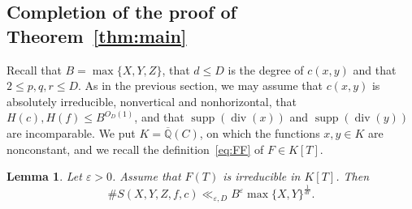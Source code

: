 \documentclass[a4paper,11pt,twoside,reqno]{amsart}
\newtheorem{lemma}[theorem]{Lemma}
\theoremstyle{definition}
\theoremstyle{remark}
\numberwithin{equation}{section}
\newcommand\eps{\varepsilon}
\newcommand\ve{\varepsilon}
\newcommand\supp{\operatorname{supp}}
\newcommand\Q{\mathbb{Q}}
\newcommand\1{\mathbf{1}}
\renewcommand{\leq}{\leqslant}
\begin{document}
\subsection{Completion of the proof of Theorem~\ref{thm:main}}

Recall that $B=\max\{X,Y,Z\}$, that $d\leq D$ is the degree of $c(x,y)$ and that 
 $2\leq p,q,r\leq D$.
As in the previous section, we may assume that $c(x,y)$ is absolutely irreducible,
nonvertical and nonhorizontal, 
that $H(c),H(f)\leq B^{O_D(1)}$, 
and 
that $\supp(\operatorname{div}(x))$ and $ \supp(\operatorname{div}(y))$ are incomparable.
We put $K=\overline{\Q}(C)$, on which the functions $x,y\in K$ are nonconstant, and we recall the definition~\eqref{eq:FF} of $F\in K[T]$.

\begin{lemma}\label{lem:irreducible-case}
	Let $\ve>0$. Assume that $F(T)$ is irreducible in $K[T]$. Then
	\[
	\#S(X,Y,Z,f,c)\ll_{\eps,D}B^{\ve}\max\{X,Y\}^{\frac{1}{dr}}.
	\]
\end{lemma}
\end{document}
